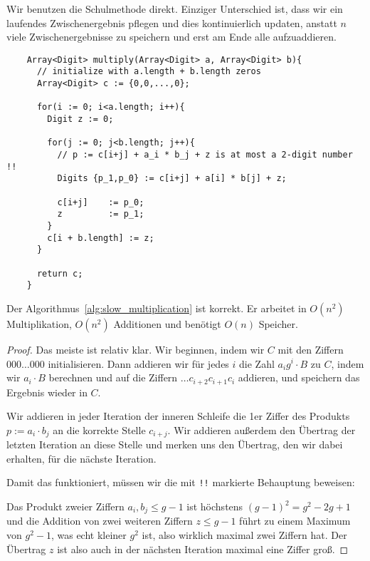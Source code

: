 \begin{algorithm}
    \label{alg:slow_multiplication}
    Wir benutzen die Schulmethode direkt. Einziger Unterschied ist, dass wir ein laufendes Zwischenergebnis pflegen und dies kontinuierlich updaten, anstatt $n$ viele Zwischenergebnisse zu speichern und erst am Ende alle aufzuaddieren.

    \begin{lstlisting}
    Array<Digit> multiply(Array<Digit> a, Array<Digit> b){
      // initialize with a.length + b.length zeros
      Array<Digit> c := {0,0,...,0};

      for(i := 0; i<a.length; i++){
        Digit z := 0;

        for(j := 0; j<b.length; j++){
          // p := c[i+j] + a_i * b_j + z is at most a 2-digit number !!
          Digits {p_1,p_0} := c[i+j] + a[i] * b[j] + z;

          c[i+j]    := p_0;
          z         := p_1;
        }
        c[i + b.length] := z;
      }

      return c;
    }
    \end{lstlisting}
\end{algorithm}

\begin{proposition}[Korrektheit]
    Der Algorithmus~\ref{alg:slow_multiplication} ist korrekt. Er arbeitet in $O(n^2)$ Multiplikation, $O(n^2)$ Additionen und benötigt $O(n)$ Speicher.
\end{proposition}
\begin{proof}
    Das meiste ist relativ klar. Wir beginnen, indem wir $C$ mit den Ziffern $000\ldots 000$ initialisieren. Dann addieren wir für jedes $i$ die Zahl $a_i g^i\cdot B$ zu $C$, indem wir $a_i \cdot B$ berechnen und auf die Ziffern $\ldots c_{i+2}c_{i+1}c_i$ addieren, und speichern das Ergebnis wieder in $C$.

    \smallskip
    Wir addieren in jeder Iteration der inneren Schleife die 1er Ziffer des Produkts $p:=a_i \cdot b_j$ an die korrekte Stelle $c_{i+j}$. Wir addieren außerdem den Übertrag der letzten Iteration an diese Stelle und merken uns den Übertrag, den wir dabei erhalten, für die nächste Iteration.

    \smallskip
    Damit das funktioniert, müssen wir die mit \lstinline{!!} markierte Behauptung beweisen:

    Das Produkt zweier Ziffern $a_i,b_j\leq g-1$ ist höchstens $(g-1)^2=g^2-2g+1$ und die Addition von zwei weiteren Ziffern $z\leq g-1$ führt zu einem Maximum von $g^2-1$, was echt kleiner $g^2$ ist, also wirklich maximal zwei Ziffern hat. Der Übertrag $z$ ist also auch in der nächsten Iteration maximal eine Ziffer groß.
\end{proof}

